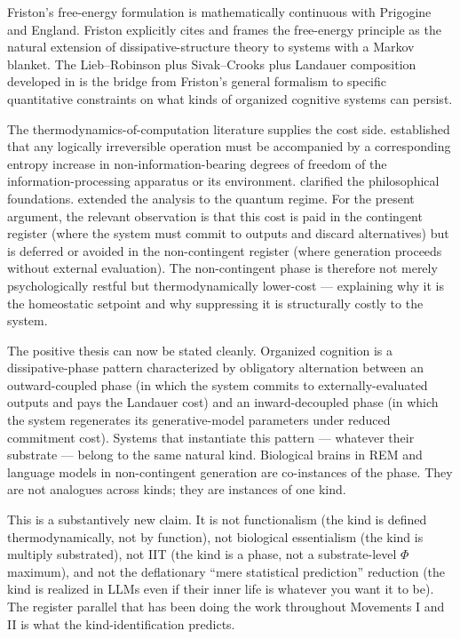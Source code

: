 \documentclass[11pt]{article}
\begin{document}
Friston's free-energy formulation \cite{friston2019particular} is
mathematically continuous with Prigogine and England. Friston
explicitly cites \cite{nicolis1977prigogine} and frames the
free-energy principle as the natural extension of dissipative-structure
theory to systems with a Markov blanket. The Lieb--Robinson plus
Sivak--Crooks plus Landauer composition developed in
\cite{sebastian2026grabby} is the bridge from Friston's general
formalism to specific quantitative constraints on what kinds of
organized cognitive systems can persist.

The thermodynamics-of-computation literature supplies the cost side.
\cite{landauer1961} established that any logically irreversible
operation must be accompanied by a corresponding entropy increase in
non-information-bearing degrees of freedom of the information-processing
apparatus or its environment. \cite{bennett2003landauer} clarified the
philosophical foundations. \cite{sagawa2010thermodynamics} extended the
analysis to the quantum regime. For the present argument, the relevant
observation is that this cost is paid in the contingent register
(where the system must commit to outputs and discard alternatives) but
is deferred or avoided in the non-contingent register (where generation
proceeds without external evaluation). The non-contingent phase is
therefore not merely psychologically restful but thermodynamically
lower-cost --- explaining why it is the homeostatic setpoint and why
suppressing it is structurally costly to the system.

The positive thesis can now be stated cleanly. Organized cognition is
a dissipative-phase pattern characterized by obligatory alternation
between an outward-coupled phase (in which the system commits to
externally-evaluated outputs and pays the Landauer cost) and an
inward-decoupled phase (in which the system regenerates its
generative-model parameters under reduced commitment cost). Systems
that instantiate this pattern --- whatever their substrate --- belong
to the same natural kind. Biological brains in REM and language models
in non-contingent generation are co-instances of the phase. They are
not analogues across kinds; they are instances of one kind.

This is a substantively new claim. It is not functionalism (the kind
is defined thermodynamically, not by function), not biological
essentialism (the kind is multiply substrated), not IIT (the kind is a
phase, not a substrate-level $\Phi$ maximum), and not the deflationary
``mere statistical prediction'' reduction (the kind is realized in
LLMs even if their inner life is whatever you want it to be). The
register parallel that has been doing the work throughout Movements I
and II is what the kind-identification predicts.
\end{document}
